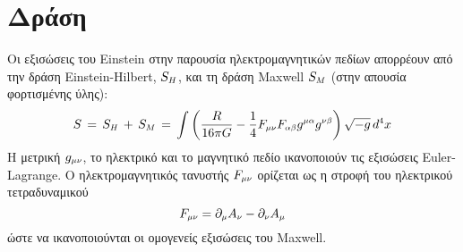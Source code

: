 \section{Δράση}
Οι εξισώσεις του Einstein στην παρουσία ηλεκτρομαγνητικών πεδίων απορρέουν από την δράση Einstein-Hilbert, $S\subscr{H}$, και τη δράση Maxwell $S\subscr{M}$ (στην απουσία φορτισμένης ύλης):
\begin{equation}\label{actionEH}
    S \,=\, S\subscr{H}\,+\,S\subscr{M} \,=\,\int \left( \frac{R}{16\pi G}-\frac{1}{4}F\subscr{\mu\nu} F\subscr{\alpha\beta}g\superscr{\mu\alpha}g\superscr{\nu\beta} \right)\sqrt{-g}\,d\superscr{4}x 
\end{equation}
Η μετρική $\g{\mu}{\nu}$, το ηλεκτρικό και το μαγνητικό πεδίο ικανοποιούν τις εξισώσεις Euler-Lagrange. Ο ηλεκτρομαγνητικός τανυστής $F\subscr{\mu\nu}$ ορίζεται ως η στροφή του ηλεκτρικού τετραδυναμικού 
\begin{equation*}
    F\subscr{\mu\nu} = \partial\subscr{\mu} A\subscr{\nu} - \partial\subscr{\nu} A\subscr{\mu}
\end{equation*}
ώστε να ικανοποιούνται οι ομογενείς εξισώσεις του Maxwell.

